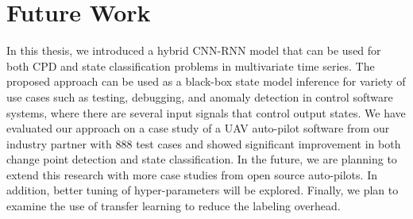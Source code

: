 \chapter{Future Work}
In this thesis, we introduced a hybrid CNN-RNN model that can be used for both CPD and state classification problems in multivariate time series. The proposed approach can be used as a black-box state model inference for variety of use cases such as testing, debugging, and anomaly detection in control software systems, where there are several input signals that control output states. We have evaluated our approach on a case study of a UAV auto-pilot software from our industry partner with 888 test cases and showed significant improvement in both change point detection and state classification. In the future, we are planning to extend this research with more case studies from open source auto-pilots. In addition, better tuning of hyper-parameters will be explored. Finally, we plan to examine the use of transfer learning to reduce the labeling overhead.


